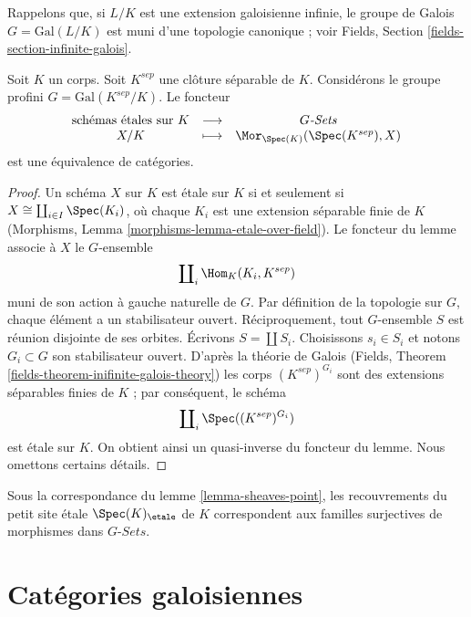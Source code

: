 \medskip\noindent
Rappelons que, si $L/K$ est une extension galoisienne infinie, le groupe de
Galois $G = \text{Gal}(L/K)$ est muni d'une topologie canonique ; voir
Fields, Section \ref{fields-section-infinite-galois}.

\begin{lemma}
\label{lemma-sheaves-point}
Soit $K$ un corps. Soit $K^{sep}$ une clôture séparable de $K$.
Considérons le groupe profini $G = \text{Gal}(K^{sep}/K)$.
Le foncteur
$$
\begin{matrix}
\text{schémas étales sur }K &
\longrightarrow &
G\textit{-Sets} \\
X/K & \longmapsto &
\Mor_{\Spec(K)}(\Spec(K^{sep}), X)
\end{matrix}
$$
est une équivalence de catégories.
\end{lemma}

\begin{proof}
Un schéma $X$ sur $K$ est étale sur $K$ si et seulement si
$X \cong \coprod_{i\in I} \Spec(K_i)$, où chaque $K_i$ est une extension
séparable finie de $K$
(Morphisms, Lemma \ref{morphisms-lemma-etale-over-field}).
Le foncteur du lemme associe à $X$ le $G$-ensemble
$$
\coprod\nolimits_i \Hom_K(K_i, K^{sep})
$$
muni de son action à gauche naturelle de $G$. Par définition de la topologie
sur $G$, chaque élément a un stabilisateur ouvert. Réciproquement, tout
$G$-ensemble $S$ est réunion disjointe de ses orbites. Écrivons
$S = \coprod S_i$. Choisissons $s_i \in S_i$ et notons $G_i \subset G$ son
stabilisateur ouvert. D'après la théorie de Galois
(Fields, Theorem \ref{fields-theorem-inifinite-galois-theory})
les corps $(K^{sep})^{G_i}$ sont des extensions séparables finies de $K$ ;
par conséquent, le schéma
$$
\coprod\nolimits_i \Spec((K^{sep})^{G_i})
$$
est étale sur $K$. On obtient ainsi un quasi-inverse du foncteur du lemme.
Nous omettons certains détails.
\end{proof}

\begin{remark}
\label{remark-covering-surjective}
Sous la correspondance du lemme \ref{lemma-sheaves-point}, les recouvrements
du petit site étale $\Spec(K)_\etale$ de $K$ correspondent aux familles
surjectives de morphismes dans $G\textit{-Sets}$.
\end{remark}









\section{Catégories galoisiennes}
\label{section-galois}

